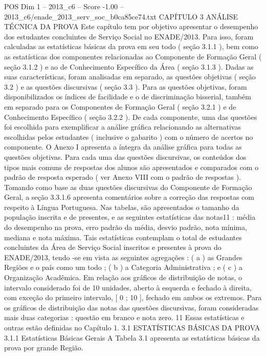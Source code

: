 \begin{textsample}{POS Dim 1 – 2013\_c6 – Score -1.00 – 2013\_c6/enade\_2013\_serv\_soc\_b0ca85ce74.txt}  \label{ex:f1_pos_175}
CAPÍTULO 3 ANÁLISE TÉCNICA DA PROVA Este capítulo tem por objetivo apresentar o desempenho dos estudantes concluintes de Serviço Social no ENADE/2013.
Para isso, foram calculadas as estatísticas básicas da prova em seu todo ( seção 3.1.1 ), bem como as estatísticas dos componentes relacionadas ao Componente de Formação Geral ( seção 3.1.2 ) e ao de Conhecimento Específico da Área ( seção 3.1.3 ).
Dadas as suas características, foram analisadas em separado, as questões objetivas ( seção 3.2 ) e as questões discursivas ( seção 3.3 ).
Para as questões objetivas, foram disponibilizados os índices de facilidade e o de discriminação bisserial, também em separado para os Componentes de Formação Geral ( seção 3.2.1 ) e de Conhecimento Específico ( seção 3.2.2 ).
De cada componente, uma das questões foi escolhida para exemplificar a análise gráfica relacionando as alternativas escolhidas pelos estudantes ( inclusive o gabarito ) com o número de acertos no componente.
O Anexo I apresenta a íntegra da análise gráfica para todas as questões objetivas.
Para cada uma das questões discursivas, os conteúdos dos tipos mais comuns de respostas dos alunos são apresentados e comparados com o padrão de resposta esperado ( ver Anexo VIII com o padrão de respostas ).
Tomando como base as duas questões discursivas do Componente de Formação Geral, a seção 3.3.1.6 apresenta comentários sobre a correção das respostas com respeito à Língua Portuguesa.
Nas tabelas, são apresentados o tamanho da população inscrita e de presentes, e as seguintes estatísticas das notas11 : média do desempenho na prova, erro padrão da média, desvio padrão, nota mínima, mediana e nota máxima.
Tais estatísticas contemplam o total de estudantes concluintes da Área de Serviço Social inscritos e presentes à prova do ENADE/2013, tendo -se em vista as seguintes agregações : ( a ) as Grandes Regiões e o país como um todo ; ( b ) a Categoria Administrativa ; e ( c ) a Organização Acadêmica.
Em relação aos gráficos de distribuição de notas, o intervalo considerado foi de 10 unidades, aberto à esquerda e fechado à direita, com exceção do primeiro intervalo, [ 0 ; 10 ], fechado em ambos os extremos.
Para os gráficos de distribuição das notas das questões discursivas, foram consideradas mais duas categorias : questão em branco e nota zero. 11 Essas estatísticas e outras estão definidas no Capítulo 1. 3.1 ESTATÍSTICAS BÁSICAS DA PROVA 3.1.1 Estatísticas Básicas Gerais A Tabela 3.1 apresenta as estatísticas básicas da prova por grande Região.

\end{textsample}
